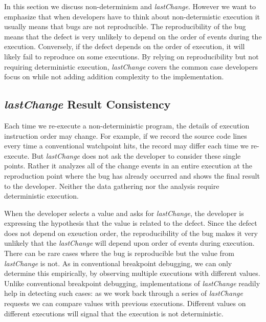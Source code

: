 \documentclass{sig-alternate}
\begin{document}
 In this section we discuss non-determinism and \textit{lastChange}. However we want 
to emphasize that when developers have to think about non-determistic execution 
it usually means that bugs are not reproducible. 
The reproducibility of the bug
means that the defect is very unlikely to depend on the order of
events during the execution. Conversely, if the defect depends on the order of execution, 
it will likely fail to reproduce on some executions. By relying on reproducibility but 
not requiring deterministic execution, \textit{lastChange} covers the common case 
developers focus on while not adding addition complexity to the implementation.


\subsection{{\large\bf\textit{lastChange}} Result Consistency}
\label{sec:resultConsistency}

Each time we re-execute a non-deterministic program, 
the details of execution instruction order may change. 
For example, if we record the source code lines every time
a conventional watchpoint hits, the record may differ each time we
re-execute. But \textit{lastChange} does not ask the developer to
consider these single points. Rather it analyzes all of the
change events in an entire execution at the reproduction point where the bug
has already occurred and shows the final result to the developer. 
Neither the data gathering nor the analysis require deterministic execution.

When the developer selects a value and
asks for \textit{lastChange}, the developer is expressing the hypothesis that
the value is related to the defect. Since the defect does not depend on
 exeuction order, the reproducibility of
the bug makes it very unlikely that the \textit{lastChange} will
depend upon order of events during execution.
There can be rare cases where the bug is reproducible but the
value from \textit{lastChange} is not. As in conventional breakpoint
debugging, we can only determine this empirically, by observing
multiple executions with different values. Unlike conventional
breakpoint debugging, implementations of \textit{lastChange} readily
help in detecting such cases: as we work back through a series of
\textit{lastChange} requests we can compare values with previous
executions. Different values on different executions will signal that
the execution is not deterministic. 
\end{document}
